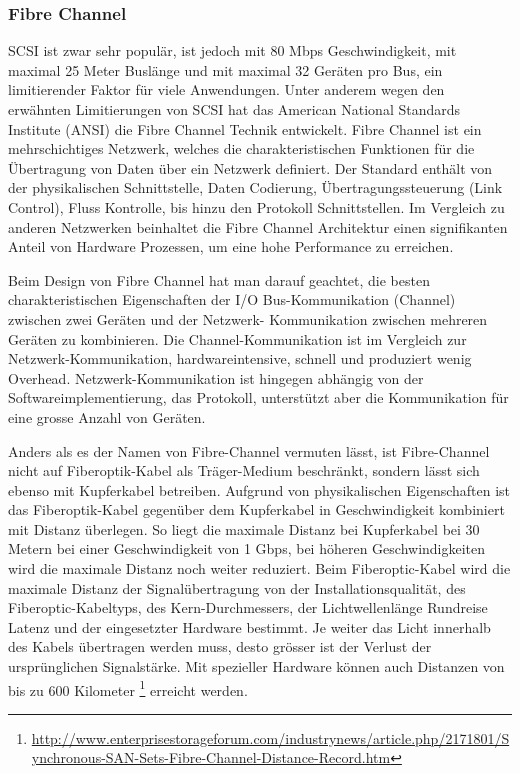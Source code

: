 \subsubsection{Fibre Channel}
SCSI ist zwar sehr populär, ist jedoch mit 80 Mbps Geschwindigkeit, mit maximal 25 Meter Buslänge und mit maximal 32 Geräten pro Bus, ein limitierender Faktor für viele Anwendungen. Unter anderem wegen den erwähnten Limitierungen von SCSI hat das American National Standards Institute (ANSI) die Fibre Channel Technik entwickelt. Fibre Channel ist ein mehrschichtiges Netzwerk, welches die charakteristischen Funktionen für die Übertragung von Daten über ein Netzwerk definiert. Der Standard enthält von der physikalischen Schnittstelle, Daten Codierung, Übertragungssteuerung (Link Control), Fluss Kontrolle, bis hinzu den Protokoll Schnittstellen. Im Vergleich zu anderen Netzwerken beinhaltet die Fibre Channel Architektur einen signifikanten Anteil von Hardware Prozessen, um eine hohe Performance zu erreichen.\cite{Gupta2002}\cite{Christopher2009}

Beim Design von Fibre Channel hat man darauf geachtet, die besten charakteristischen Eigenschaften der I/O Bus-Kommunikation (Channel) zwischen zwei Geräten und der Netzwerk- Kommunikation zwischen mehreren Geräten zu kombinieren. Die Channel-Kommunikation ist im Vergleich zur Netzwerk-Kommunikation, hardwareintensive, schnell und produziert wenig Overhead. Netzwerk-Kommunikation ist hingegen abhängig von der Softwareimplementierung, das Protokoll, unterstützt aber die Kommunikation für eine grosse Anzahl von Geräten.

Anders als es der Namen von Fibre-Channel vermuten lässt, ist Fibre-Channel nicht auf Fiberoptik-Kabel als Träger-Medium beschränkt, sondern lässt sich ebenso mit Kupferkabel betreiben. Aufgrund von physikalischen Eigenschaften ist das Fiberoptik-Kabel gegenüber dem Kupferkabel in Geschwindigkeit kombiniert mit Distanz überlegen. So liegt die maximale Distanz bei Kupferkabel bei 30 Metern bei einer Geschwindigkeit von 1 Gbps, bei höheren Geschwindigkeiten wird die maximale Distanz noch weiter reduziert. Beim Fiberoptic-Kabel wird die maximale Distanz der Signalübertragung von der Installationsqualität, des Fiberoptic-Kabeltyps, des Kern-Durchmessers, der Lichtwellenlänge Rundreise Latenz und der eingesetzter Hardware bestimmt. Je weiter das Licht innerhalb des Kabels übertragen werden muss, desto grösser ist der Verlust der ursprünglichen Signalstärke. Mit spezieller Hardware können auch Distanzen von bis zu 600 Kilometer \footnote{\url{http://www.enterprisestorageforum.com/industrynews/article.php/2171801/Synchronous-SAN-Sets-Fibre-Channel-Distance-Record.htm}} erreicht werden.

